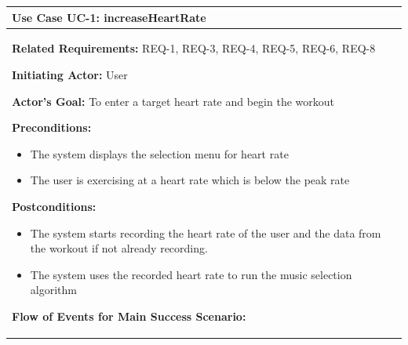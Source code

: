 \documentclass[letterpaper,english, 12pt]{scrreprt}
\begin{document}
\begin{center}
        \begin{tabular}{|C{15cm}|}
                \hline
                        \textbf{Use Case UC-1: increaseHeartRate}\\
                \hline
                        \begin{flushleft}
                                \textbf{Related Requirements: } REQ-1, REQ-3, REQ-4, REQ-5, REQ-6, REQ-8
                        \end{flushleft}
                        \begin{flushleft}
                                \textbf{Initiating Actor: } User
                        \end{flushleft}
                        \begin{flushleft}
                                \textbf{Actor's Goal: } To enter a target heart rate and begin the workout
                        \end{flushleft}
                        \begin{flushleft}
                                \textbf{Preconditions: }
                        \end{flushleft}
                                \begin{itemize}
                                        \item The system displays the selection menu for heart rate
                                        \item The user is exercising at a heart rate which is below the peak rate
                                \end{itemize}
                        \begin{flushleft}
                                \textbf{Postconditions: }
                        \end{flushleft}
                                \begin{itemize}
                                        \item The system starts recording the heart rate of the user and the data from the workout if not already recording.
                                        \item The system uses the recorded heart rate to run the music selection algorithm
                                \end{itemize}
                        \begin{flushleft}
                                \textbf{Flow of Events for Main Success Scenario: }

\end{flushleft}
\end{tabular}
\end{center}
\end{document}
